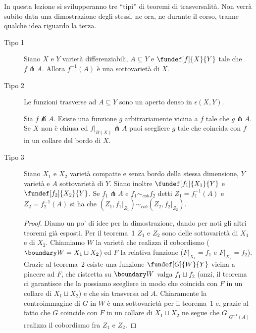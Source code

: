 
In questa lezione si svilupperanno tre ``tipi'' di teoremi di trasversalità. Non verrà subito data una dimostrazione degli stessi, ne ora, ne durante il corso, tranne qualche idea riguardo la terza.

\begin{description}
\item [Tipo 1] %
\begin{teo}[Teorema 1]
Siano $X$ e $Y$ varietà differenziabili, $A\subseteq Y$ e $\fundef[f]{X}{Y}$  tale che $f\pitchfork A$. Allora $f^{-1}(A)$ è una sottovarietà di $X$.
\end{teo}
\item [Tipo 2] %
\begin{teo}[Teorema 2]
Le funzioni trasverse ad $A\subseteq Y$ sono un aperto denso in $\epsilon(X, Y)$. 
\end{teo}
\begin{teo}[Teorema 2++] %
Sia $f \not\pitchfork A$. Esiste una funzione $g$ arbitrariamente vicina a $f$ tale che $g\pitchfork A$. Se $X$ non è chiusa ed $f|_{B(X)} \pitchfork A$ puoi scegliere $g$ tale che coincida con $f$ in un collare del bordo di $X$. 
\end{teo}
\item [Tipo 3] %
\begin{teo}[Teorema 3]
Siano $X_1$ e $X_2$ varietà compatte e senza bordo della stessa dimensione, $Y$ varietà e $A$ sottovarietà di $Y$. Siano inoltre $\fundef[f_1]{X_1}{Y}$ e $\fundef[f_2]{X_2}{Y}$. Se $f_1 \pitchfork A$ e $f_1 \sim_{cob} f_2$ detti $Z_1=f_1^{-1}(A)$ e $Z_2=f_2^{-1}(A)$ si ha che $(Z_1, f_1|_{Z_1}) \sim_{cob} (Z_2,f_2|_{Z_2})$. 
\end{teo}
\begin{proof}
 Diamo un po' di idee per la dimostrazione, dando per noti gli altri teoremi già esposti. Per il teorema~1 $Z_1$ e $Z_2$ sono delle sottovarietà di $X_1$ e di $X_2$. Chiamiamo $W$ la varietà che realizza il cobordismo ($\boundary W = X_1 \sqcup X_2$) ed $F$ la relativa funzione ($F|_{X_1} = f_1$ e $F|_{X_2}=f_2$). Grazie al teorema~2 esiste una funzione $\fundef[G]{W}{Y}$ vicina a piacere ad $F$, che ristretta su $\boundary W$ valga $f_1\sqcup f_2$ (anzi, il teorema ci garantisce che la possiamo scegliere in modo che coincida con $F$ in un collare di $X_1\sqcup X_2$) e che sia trasversa ad $A$. Chiaramente la controimmagine di $G$ in $W$ è una sottovarietà per il teorema~1 e, grazie al fatto che $G$ coincide con $F$ in un collare di $X_1 \sqcup X_2$ ne segue che $G|_{G^{-1}(A)}$ realizza il cobordismo fra $Z_1$ e $Z_2$.
 \end{proof}
\end{description}

